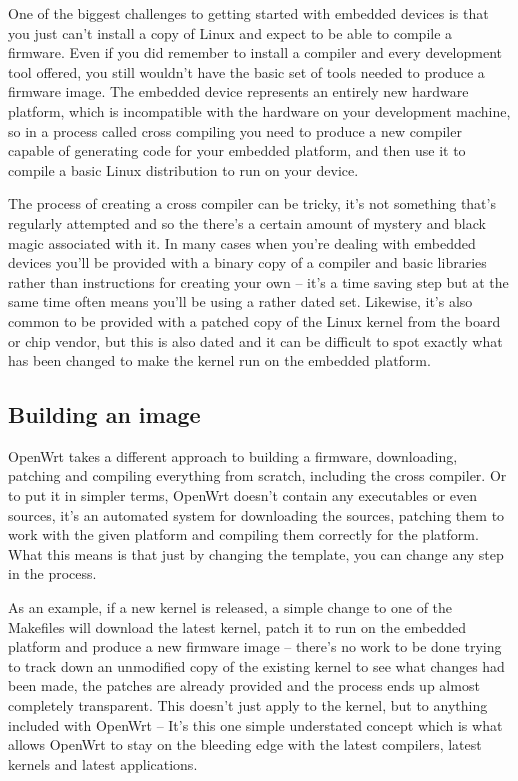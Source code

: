 One of the biggest challenges to getting started with embedded devices is that you
just can't install a copy of Linux and expect to be able to compile a firmware.
Even if you did remember to install a compiler and every development tool offered,
you still wouldn't have the basic set of tools needed to produce a firmware image.
The embedded device represents an entirely new hardware platform, which is
incompatible with the hardware on your development machine, so in a process called
cross compiling you need to produce a new compiler capable of generating code for
your embedded platform, and then use it to compile a basic Linux distribution to
run on your device.

The process of creating a cross compiler can be tricky, it's not something that's
regularly attempted and so the there's a certain amount of mystery and black magic
associated with it. In many cases when you're dealing with embedded devices you'll
be provided with a binary copy of a compiler and basic libraries rather than
instructions for creating your own -- it's a time saving step but at the same time
often means you'll be using a rather dated set. Likewise, it's also common to be
provided with a patched copy of the Linux kernel from the board or chip vendor,
but this is also dated and it can be difficult to spot exactly what has been
changed to make the kernel run on the embedded platform.

\subsection{Building an image}

OpenWrt takes a different approach to building a firmware, downloading, patching
and compiling everything from scratch, including the cross compiler. Or to put it
in simpler terms, OpenWrt doesn't contain any executables or even sources, it's an
automated system for downloading the sources, patching them to work with the given
platform and compiling them correctly for the platform. What this means is that
just by changing the template, you can change any step in the process.


As an example, if a new kernel is released, a simple change to one of the Makefiles
will download the latest kernel, patch it to run on the embedded platform and produce
a new firmware image -- there's no work to be done trying to track down an unmodified
copy of the existing kernel to see what changes had been made, the patches are
already provided and the process ends up almost completely transparent. This doesn't
just apply to the kernel, but to anything included with OpenWrt -- It's this one
simple understated concept which is what allows OpenWrt to stay on the bleeding edge
with the latest compilers, latest kernels and latest applications.

